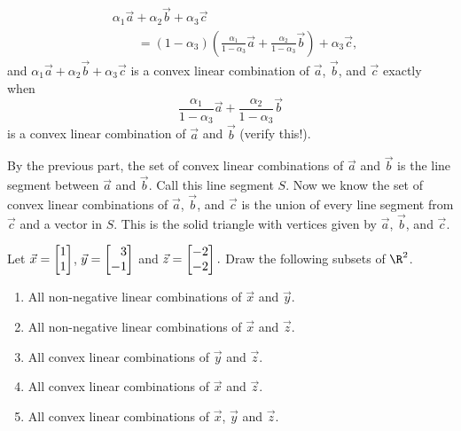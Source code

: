 \begin{exercises}
\begin{problist}
\begin{solution}
\begin{enumerate}
				\[
				\begin{split}
					&\alpha_{1} \vec a+\alpha_{2} \vec b+ \alpha_{3}
					\vec c \\
					&\qquad= (1-\alpha_{3})\left(\tfrac{\alpha_1}{1-\alpha_3}\vec
					a + \tfrac{\alpha_2}{1-\alpha_3}\vec b\right)+\alpha_{3}
					\vec c,
				\end{split}
				\]
				 and $\alpha_{1} \vec a+\alpha_{2} \vec b+ \alpha_{3}
				\vec c$ is a convex linear combination of $\vec
				a$, $\vec b$, and $\vec c$ exactly when
				\[
					\frac{\alpha_1}{1-\alpha_3}\vec a + \frac{\alpha_2}{1-\alpha_3}\vec
					b
				\]
				 is a convex linear combination of $\vec a$ and $\vec
				b$ (verify this!).

				By the previous part, the set of convex linear combinations
				of $\vec a$ and $\vec b$ is the line segment
				between $\vec a$ and $\vec b$. Call this line segment $S$.
				Now we know the set of convex linear
				combinations of $\vec a$, $\vec b$, and $\vec c$
				is the union of every line segment from $\vec c$
				and a vector in $S$. This is the solid triangle with
				vertices given by $\vec a$, $\vec b$, and $\vec	c$.
		\end{enumerate}
	\end{solution}

	\prob
		Let $\vec x=\mat{1 \\ 1}$, $\vec y = \mat{3 \\ -1}$ and $\vec z=\mat{-2 \\ -2}.$  Draw the following subsets of $\R^2$.
		\begin{enumerate}
		\item All non-negative linear combinations of $\vec x$ and $\vec y$.
		\item All non-negative linear combinations of $\vec x$ and $\vec z$.
		\item\label{PROBcconvex} All convex linear combinations of $\vec y$ and $\vec z$.
		\item\label{PROBdconvex} All convex linear combinations of $\vec x$ and $\vec z$.
		\item All convex linear combinations of $\vec x$, $\vec y$ and $\vec z$.


\end{enumerate}
\end{problist}
\end{exercises}
